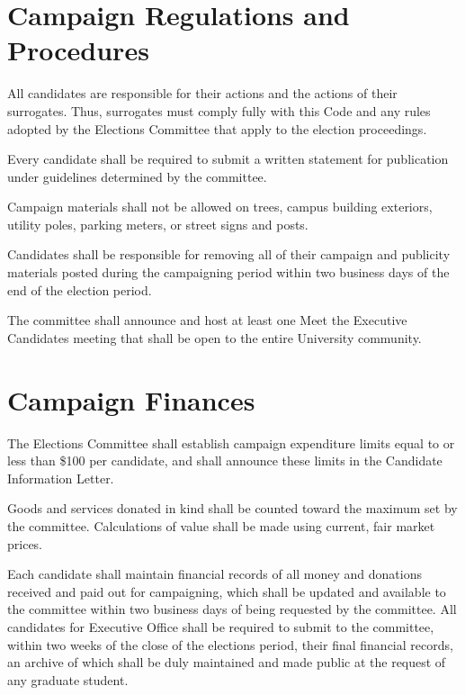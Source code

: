 \section{Campaign Regulations and Procedures}
\begin{bylaws-number}
  \item All candidates are responsible for their actions and the actions of their surrogates. Thus, surrogates must comply fully with this Code and any rules adopted by the Elections Committee that apply to the election proceedings.
  \item Every candidate shall be required to submit a written statement for publication under guidelines determined by the committee.
  \item Campaign materials shall not be allowed on trees, campus building exteriors, utility poles, parking meters, or street signs and posts.
  \item Candidates shall be responsible for removing all of their campaign and publicity materials posted during the campaigning period within two business days of the end of the election period.
  \item The committee shall announce and host at least one Meet the Executive Candidates meeting that shall be open to the entire University community.
\end{bylaws-number}

\section{Campaign Finances}
\begin{bylaws-number}
  \item The Elections Committee shall establish campaign expenditure limits equal to or less than \$100 per candidate, and shall announce these limits in the Candidate Information Letter.
  \item Goods and services donated in kind shall be counted toward the maximum set by the committee. Calculations of value shall be made using current, fair market prices.
  \item Each candidate shall maintain financial records of all money and donations received and paid out for campaigning, which shall be updated and available to the committee within two business days of being requested by the committee. All candidates for Executive Office shall be required to submit to the committee, within two weeks of the close of the elections period, their final financial records, an archive of which shall be duly maintained and made public at the request of any graduate student.
\end{bylaws-number}

